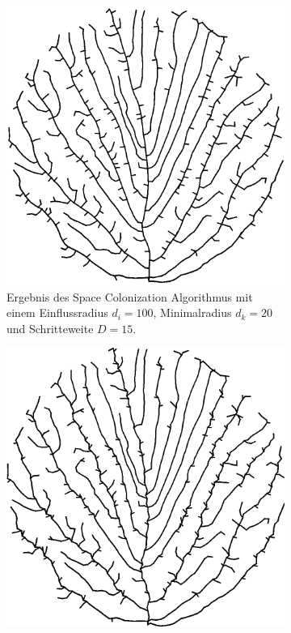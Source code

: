\begin{figure} [hbtp]
\begin{subfigure}[t]{.35\textwidth}
		\includegraphics[width=\linewidth]{images/SCA_Extended2.png}
		\caption{Ergebnis des Space Colonization Algorithmus mit einem Einflussradius $d_i = 100$, Minimalradius $d_k = 20$ und Schritteweite $D = 15$.}
		\label{subfig:SCA_Extended2}
	\end{subfigure}
	\begin{subfigure}[t]{.35\textwidth}
		\centering
		\includegraphics[width=\linewidth]{images/SCA_Extended3.png}

\end{subfigure}
\end{figure}
